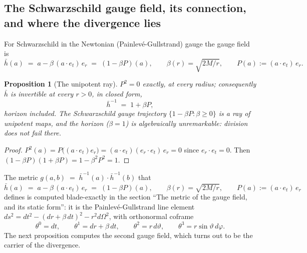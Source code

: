 \documentclass[11pt]{article}
\newtheorem{proposition}[theorem]{Proposition}
\theoremstyle{definition}
\theoremstyle{plain}
\providecommand{\er}{}\renewcommand{\er}{e_r}
\providecommand{\et}{}\renewcommand{\et}{e_t}
\providecommand{\hb}{}\renewcommand{\hb}{\bar{h}}
\begin{document}
\subsection*{The Schwarzschild gauge field, its connection, and where the divergence lies}
\label{c:note.singularity.setting-schwarzschild-gauge-field-connection-where}
For Schwarzschild in the Newtonian (Painlev\'e-Gullstrand) gauge the gauge field is
\begin{equation}
\hb(a) \;=\; a - \beta\,(a \cdot \et)\,\er \;=\; (1 - \beta P)(a), \qquad \beta(r) = \sqrt{2M/r}, \qquad P(a) := (a \cdot \et)\,\er .
\end{equation}

\begin{proposition}[The unipotent ray]\label{c:singularity.unipotent-ray}
$P^2 = 0$ exactly, at every radius; consequently $\hb$ is invertible at every $r > 0$, in closed form,
\[
\hb^{-1} \;=\; 1 + \beta P ,
\]
horizon included. The Schwarzschild gauge trajectory $\{1 - \beta P : \beta \geq 0\}$ is a ray of unipotent maps, and the horizon ($\beta = 1$) is algebraically unremarkable: division does not fail there.
\end{proposition}
\begin{proof}
$P^2(a) = P\bigl((a\cdot\et)\er\bigr) = (a\cdot\et)(\er\cdot\et)\,\er = 0$ since $\er \cdot \et = 0$. Then $(1 - \beta P)(1 + \beta P) = 1 - \beta^2 P^2 = 1$.

\end{proof}

\label{c:note.singularity.setting-schwarzschild-gauge-field-connection-where-2}
The metric $g(a,b) \;=\; \hb^{-1}(a) \cdot \hb^{-1}(b)$ that $\hb(a) \;=\; a - \beta\,(a \cdot \et)\,\er \;=\; (1 - \beta P)(a), \qquad \beta(r) = \sqrt{2M/r}, \qquad P(a) := (a \cdot \et)\,\er$ defines is computed blade-exactly in the section ``The metric of the gauge field, and its static form'': it is the Painlev\'e-Gullstrand line element $ds^2 = dt^2 - (dr + \beta\,dt)^2 - r^2 d\Omega^2$, with orthonormal coframe
\begin{equation}
\theta^0 = dt, \qquad \theta^1 = dr + \beta\,dt, \qquad \theta^2 = r\,d\vartheta, \qquad \theta^3 = r\sin\vartheta\,d\varphi .
\end{equation}
The next proposition computes the second gauge field, which turns out to be the carrier of the divergence.
\end{document}
